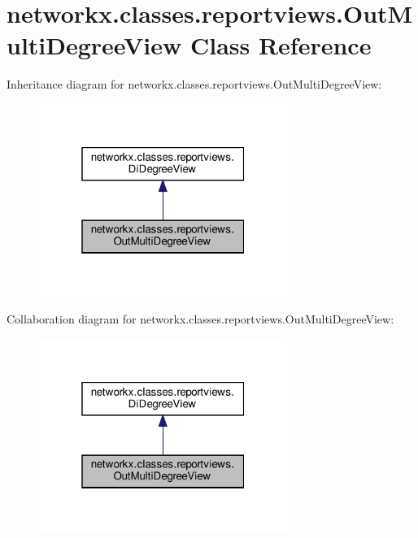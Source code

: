 \hypertarget{classnetworkx_1_1classes_1_1reportviews_1_1OutMultiDegreeView}{}\section{networkx.\+classes.\+reportviews.\+Out\+Multi\+Degree\+View Class Reference}
\label{classnetworkx_1_1classes_1_1reportviews_1_1OutMultiDegreeView}


Inheritance diagram for networkx.\+classes.\+reportviews.\+Out\+Multi\+Degree\+View\+:
\nopagebreak
\begin{figure}[H]
\begin{center}
\leavevmode
\includegraphics[width=229pt]{classnetworkx_1_1classes_1_1reportviews_1_1OutMultiDegreeView__inherit__graph}
\end{center}
\end{figure}


Collaboration diagram for networkx.\+classes.\+reportviews.\+Out\+Multi\+Degree\+View\+:
\nopagebreak
\begin{figure}[H]
\begin{center}
\leavevmode
\includegraphics[width=229pt]{classnetworkx_1_1classes_1_1reportviews_1_1OutMultiDegreeView__coll__graph}
\end{center}
\end{figure}
